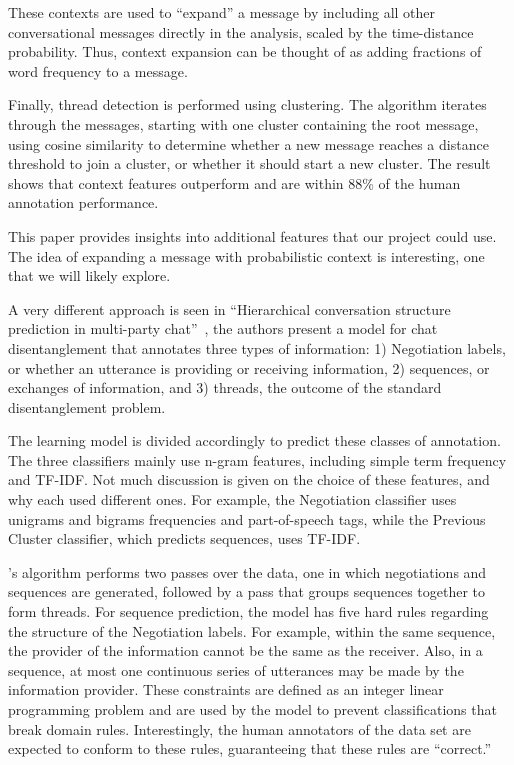 \documentclass[10pt]{article}
\newcommand{\titlecite}[2]{``#1''~\cite{#2}}
\begin{document}
These contexts are used to ``expand'' a message by including all other 
conversational messages directly in the analysis, scaled by the time-distance 
probability. Thus, context expansion can be thought of as adding fractions of 
word frequency to a message.

Finally, thread detection is performed using clustering. The algorithm iterates 
through the messages, starting with one cluster containing the root message, 
using cosine similarity to determine whether a new message reaches a distance 
threshold to join a cluster, or whether it should start a new cluster. The 
result shows that context features outperform \cite{Elsner2008a} and
are within 88\% of the human annotation performance.

This paper provides insights into additional features that our project could 
use. The idea of expanding a message with probabilistic context is 
interesting, one that we will likely explore.

A very different approach is seen in \titlecite{Hierarchical conversation
structure prediction in multi-party chat}{Mayfield2012a}, the authors present
a model for chat disentanglement that annotates three types of information: 1) 
Negotiation labels, or whether an utterance is providing or receiving 
information, 2) sequences, or exchanges of information, and 3) threads, the 
outcome of the standard disentanglement problem.

The learning model is divided accordingly to predict these classes of
annotation. The three classifiers mainly use n-gram features, including simple
term frequency and TF-IDF. Not much discussion is given on the choice of these
features, and why each used different ones. For example, the Negotiation
classifier uses unigrams and bigrams frequencies and part-of-speech tags, while
the Previous Cluster classifier, which predicts sequences, uses TF-IDF. 

\cite{Mayfield2012a}'s algorithm performs two passes over the data, 
one in which negotiations and sequences are generated, followed by a pass
that groups sequences together to form threads. For sequence prediction, 
the model has five hard rules regarding the
structure of the Negotiation labels. For example, within the same sequence, the
provider of the information cannot be the same as the receiver. Also, in a
sequence, at most one continuous series of utterances may be made by the
information provider. These constraints are defined as an integer linear
programming problem and are used by the model to prevent classifications that
break domain rules. Interestingly, the human annotators of the data set are
expected to conform to these rules, guaranteeing that these rules are
“correct.”
\end{document}

